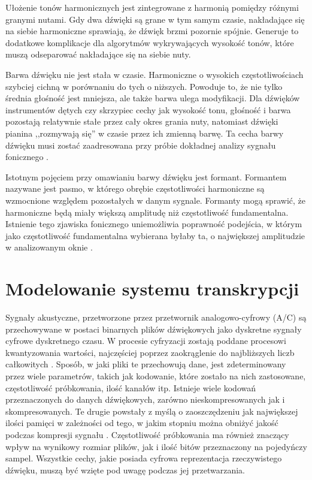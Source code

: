 \documentclass[12pt,a4paper,twoside]{mwart}
\begin{document}
Ułożenie tonów harmonicznych jest zintegrowane z harmonią pomiędzy różnymi granymi nutami. Gdy dwa dźwięki są grane w tym samym czasie, nakładające się na siebie harmoniczne sprawiają, że dźwięk brzmi pozornie spójnie. Generuje to dodatkowe komplikacje dla algorytmów wykrywających wysokość tonów, które muszą odseparować nakładające się na siebie nuty.

Barwa dźwięku nie jest stała w czasie. Harmoniczne o wysokich częstotliwościach szybciej cichną w porównaniu do tych o niższych. Powoduje to, że nie tylko średnia głośność jest mniejsza, ale także barwa ulega modyfikacji. Dla dźwięków instrumentów dętych czy skrzypiec cechy jak wysokość tonu, głośność i barwa pozostają relatywnie stałe przez cały okres grania nuty, natomiast dźwięki pianina ,,rozmywają się'' w czasie przez ich zmienną barwę. Ta cecha barwy dźwięku musi zostać zaadresowana przy próbie dokładnej analizy sygnału fonicznego 
\cite[64-65]{Homerecording:DlaKazdego}
\cite[804–805]{Transcription:Klapuri:MultipleFundamentalFrequencyEstimation}.


Istotnym pojęciem przy omawianiu barwy dźwięku jest formant. Formantem nazywane jest pasmo, w którego obrębie częstotliwości harmoniczne są wzmocnione względem pozostałych w danym sygnale. Formanty mogą sprawić, że harmoniczne będą miały większą amplitudę niż częstotliwość fundamentalna. Istnienie tego zjawiska fonicznego uniemożliwia poprawność podejścia, w którym jako częstotliwość fundamentalna wybierana byłaby ta, o największej amplitudzie w analizowanym oknie 
\cite[24-25]{Transcription:Klapuri:Phd}.

\clearpage

\section{Modelowanie systemu transkrypcji} \label{sec:modelowanieSystemu}
Sygnały akustyczne, przetworzone przez przetwornik analogowo-cyfrowy (A/C) są przechowywane w postaci binarnych plików dźwiękowych jako dyskretne sygnały cyfrowe dyskretnego czasu. W procesie cyfryzacji zostają poddane procesowi kwantyzowania wartości, najczęściej poprzez zaokrąglenie do najbliższych liczb całkowitych 
\cite[1-4]{CyfrowePrzetwarzanieSygnalowOdTeoriiDoZastosowan}.
Sposób, w jaki pliki te przechowują dane, jest zdeterminowany przez wiele parametrów, takich jak kodowanie, które zostało na nich zastosowane, częstotliwość próbkowania, ilość kanałów itp. Istnieje wiele kodowań przeznaczonych do danych dźwiękowych, zarówno nieskompresowanych jak i skompresowanych. Te drugie powstały z myślą o zaoszczędzeniu jak największej ilości pamięci w zależności od tego, w jakim stopniu można obniżyć jakość podczas kompresji sygnału 
\cite[66]{Homerecording:DlaKazdego}.
Częstotliwość próbkowania ma również znaczący wpływ na wynikowy rozmiar plików, jak i ilość bitów przeznaczony na pojedyńczy sampel. Wszystkie cechy, jakie posiada cyfrowa reprezentacja rzeczywistego dźwięku, muszą być wzięte pod uwagę podczas jej przetwarzania.
\end{document}

